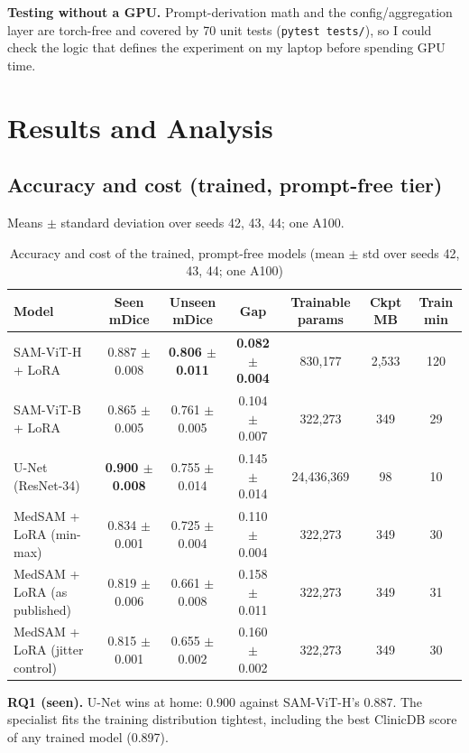 \documentclass[conference]{IEEEtran}
\begin{document}
\textbf{Testing without a GPU.} Prompt-derivation math and the config/aggregation layer are torch-free and covered by 70 unit tests (\texttt{pytest~tests/}), so I could check the logic that defines the experiment on my laptop before spending GPU time.


\section{Results and Analysis}\label{sec:6}

\subsection{Accuracy and cost (trained, prompt-free tier)}\label{sec:6.1}
Means $\pm$ standard deviation over seeds 42, 43, 44; one A100.

\begin{table}[t]
\centering
\footnotesize
\caption{Accuracy and cost of the trained, prompt-free models (mean $\pm$ std over seeds 42, 43, 44; one A100)}
\label{tab:4}
\begin{tabular}{lcccccc}
\hline
\textbf{Model} & \textbf{Seen mDice} & \textbf{Unseen mDice} & \textbf{Gap} & \textbf{Trainable params} & \textbf{Ckpt MB} & \textbf{Train min} \\
\hline
SAM-ViT-H + LoRA & 0.887 $\pm$ 0.008 & \textbf{0.806 $\pm$ 0.011} & \textbf{0.082 $\pm$ 0.004} & 830,177 & 2,533 & 120 \\
SAM-ViT-B + LoRA & 0.865 $\pm$ 0.005 & 0.761 $\pm$ 0.005 & 0.104 $\pm$ 0.007 & 322,273 & 349 & 29 \\
U-Net (ResNet-34) & \textbf{0.900 $\pm$ 0.008} & 0.755 $\pm$ 0.014 & 0.145 $\pm$ 0.014 & 24,436,369 & 98 & 10 \\
MedSAM + LoRA (min-max) & 0.834 $\pm$ 0.001 & 0.725 $\pm$ 0.004 & 0.110 $\pm$ 0.004 & 322,273 & 349 & 30 \\
MedSAM + LoRA (as published) & 0.819 $\pm$ 0.006 & 0.661 $\pm$ 0.008 & 0.158 $\pm$ 0.011 & 322,273 & 349 & 31 \\
MedSAM + LoRA (jitter control) & 0.815 $\pm$ 0.001 & 0.655 $\pm$ 0.002 & 0.160 $\pm$ 0.002 & 322,273 & 349 & 30 \\
\hline
\end{tabular}
\end{table}

\textbf{RQ1 (seen).} U-Net wins at home: 0.900 against SAM-ViT-H's 0.887. The specialist fits the training distribution tightest, including the best ClinicDB score of any trained model (0.897).
\end{document}
